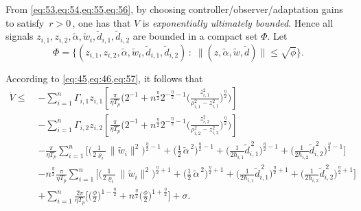 \documentclass[pdflatex,sn-mathphys-num]{sn-jnl}%
\theoremstyle{thmstyleone}%
\theoremstyle{thmstyletwo}%
\theoremstyle{thmstylethree}%
\begin{document}
From \cref{eq:53,eq:54,eq:55,eq:56}, by choosing controller/observer/adaptation gains to satisfy \(\,r>0\,\), one has that \(V\) is \emph{exponentially ultimately bounded}. Hence all signals \(z_{i,1},z_{i,2},\tilde\alpha,\tilde w_i,\tilde d_{i,1},\tilde d_{i,2}\) are bounded in a compact set \(\Phi\). Let
\begin{equation}\label{eq:57}
  \Phi
  =\Big\{(z_{i,1},z_{i,2},\tilde\alpha,\tilde w_i,\tilde d_{i,1},\tilde d_{i,2})\,:\;
          \|(z,\tilde\alpha,\tilde w,\tilde d)\|\le \sqrt{\phi}\Big\}.
\end{equation}

According to \cref{eq:45,eq:46,eq:57}, it follows that
\begin{equation}\label{eq:58}
\begin{aligned}
  \dot V \le\;&
  - \sum_{i=1}^{n}\Gamma_{i,1} z_{i,1}\!\left[
      \frac{\pi}{\eta T_p}\Big( 2^{-1}
      + n^{\frac{\eta}{2}} 2^{-\frac{\eta}{2}-1}\!
        \Big(\frac{z_{i,1}^2}{\rho_{i,1}^2-z_{i,1}^2}\Big)^{\frac{\eta}{2}}\Big)
    \right] \\[-1mm]
  &- \sum_{i=1}^{n}\Gamma_{i,2} z_{i,2}\!\left[
      \frac{\pi}{\eta T_p}\Big( 2^{-1}
      + n^{\frac{\eta}{2}} 2^{-\frac{\eta}{2}-1}\!
        \Big(\frac{z_{i,2}^2}{\rho_{i,2}^2-z_{i,2}^2}\Big)^{\frac{\eta}{2}}\Big)
    \right] \\[0.5mm]
  &-\frac{\pi}{\eta T_{p}}\sum_{i=1}^{n}\!\Big[
     \Big(\tfrac{1}{2\varrho_i}\,\|\tilde w_i\|^2\Big)^{\frac{\eta}{2}-1}
    +\Big(\tfrac{1}{2}\,\tilde\alpha^{\,2}\Big)^{\frac{\eta}{2}-1}
    +\Big(\tfrac{1}{2\hbar_{i,1}}\tilde d_{i,1}^{\,2}\Big)^{\frac{\eta}{2}-1}
    +\Big(\tfrac{1}{2\hbar_{i,2}}\tilde d_{i,2}^{\,2}\Big)^{\frac{\eta}{2}-1}
  \Big] \\[0.5mm]
  &-n^{\frac{\eta}{2}}\frac{\pi}{\eta T_{p}}\sum_{i=1}^{n}\!\Big[
     \Big(\tfrac{1}{2\varrho_i}\,\|\tilde w_i\|^2\Big)^{\frac{\eta}{2}+1}
    +\Big(\tfrac{1}{2}\,\tilde\alpha^{\,2}\Big)^{\frac{\eta}{2}+1}
    +\Big(\tfrac{1}{2\hbar_{i,1}}\tilde d_{i,1}^{\,2}\Big)^{\frac{\eta}{2}+1}
    +\Big(\tfrac{1}{2\hbar_{i,2}}\tilde d_{i,2}^{\,2}\Big)^{\frac{\eta}{2}+1}
  \Big] \\[0.5mm]
  &+\sum_{i=1}^{n}\frac{2\pi}{\eta T_{p}}
     \Big[ \big(\tfrac{\phi}{2}\big)^{1-\frac{\eta}{2}}
          + n^{\frac{\eta}{2}}\big(\tfrac{\phi}{2}\big)^{1+\frac{\eta}{2}} \Big]
   + \sigma .
\end{aligned}
\end{equation}
\end{document}
